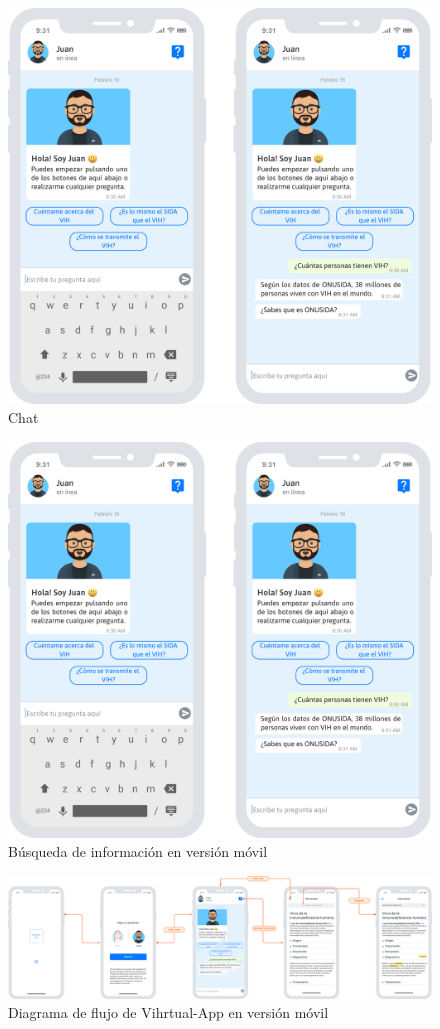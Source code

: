 \begin{figure}[htbp]
\centering
\includegraphics[scale=0.2]{../images/mobile_chat.png} 
\caption{Chat}
\label{fig:mobile chat	}
\end{figure}

\begin{figure}[htbp]
\centering
\includegraphics[scale=0.2]{../images/mobile_chat.png} 
\caption{Búsqueda de información en versión móvil}
\label{fig:mobile search	}
\end{figure}

\begin{figure}[htbp]
\centering
\includegraphics[scale=0.1]{../images/mobile_flow.png} 
\caption{Diagrama de flujo de Vihrtual-App en versión móvil}
\label{fig:mobile flow	}
\end{figure}